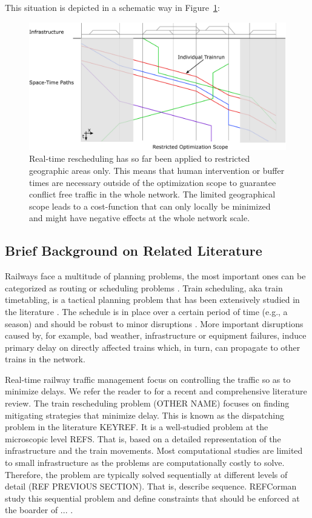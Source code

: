 \documentclass{article}
\begin{document}
This situation is depicted in a schematic way in Figure~\ref{fig:introduction_compensation}:
%
\begin{figure}[hbtp]
	\centering
  \includegraphics[width=\textwidth]{Figures/rsp_rescheduling_heute.pdf}
	\caption{Real-time rescheduling has so far been applied to restricted geographic areas only. This means that human intervention or buffer times are necessary outside of the optimization scope to guarantee conflict free traffic in the whole network. The limited geographical scope leads to a cost-function that can only locally be minimized and might have negative effects at the whole network scale.}
	\label{fig:introduction_compensation}
\end{figure}

\subsection{Brief Background on Related Literature}
Railways face a multitude of planning problems, the most important ones can be categorized as routing or scheduling problems \citep{CordEtAl98}. Train scheduling, aka train timetabling, is a tactical planning problem that has been extensively studied in the literature \citep[e.g.,][]{CaprEtAl02,CaccEtAl15}. The schedule is in place over a certain period of time (e.g., a season) and should be robust to minor disruptions \citep[e.g.,][]{LiuDess19, CaccToth12}. More important disruptions caused by, for example, bad weather, infrastructure or equipment failures, induce primary delay on directly affected trains which, in turn, can propagate to other trains in the network.

Real-time railway traffic management focus on controlling the traffic so as to minimize delays. We refer the reader to \cite{Luan19} for a recent and comprehensive literature review.
The train rescheduling problem (OTHER NAME) focuses on finding mitigating strategies that minimize delay. This is known as the dispatching problem in the literature KEYREF. It is a well-studied problem at the microscopic level REFS. That is, based on a detailed representation of the infrastructure and the train movements. Most computational studies are limited to small infrastructure as the problems are computationally costly to solve. Therefore, the problem are typically solved sequentially at different levels of detail (REF PREVIOUS SECTION). That is, describe sequence. REFCorman study this sequential problem and define constraints that should be enforced at the boarder of ... .
\end{document}
